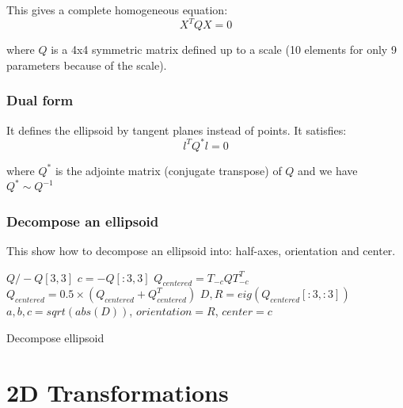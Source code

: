 This gives a complete homogeneous equation:
\begin{equation}
    X^T Q X = 0
\end{equation}

where $Q$ is a 4x4 symmetric matrix defined up to a scale (10 elements for only 9 parameters because of the scale).

\subsubsection{Dual form}
It defines the ellipsoid by tangent planes instead of points. It satisfies:
\begin{equation}
    l^T Q^* l = 0
\end{equation}

where $Q^*$ is the adjointe matrix (conjugate transpose) of $Q$ and we have $Q^* \sim Q^{-1}$


\subsubsection{Decompose an ellipsoid}
This show how to decompose an ellipsoid into: half-axes, orientation and center.

\begin{algorithm}[H]
\DontPrintSemicolon
{}
 $Q/-Q[3, 3]$ 
 $c = -Q[:3, 3]$  
 $Q_{centered} = T_{-c} Q T_{-c}^T $ 
 $Q_{centered} = 0.5\times(Q_{centered}+Q_{centered}^T)$ 
 $D, R = eig(Q_{centered}[:3, :3])$ 
 $a, b, c = sqrt(abs(D))$, $orientation = R$, $center = c$
\caption{Decompose ellipsoid}
\end{algorithm}

\section{2D Transformations}

